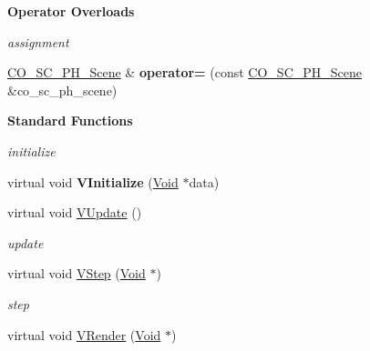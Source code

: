 \begin{Indent}{\bf Operator Overloads}\par
{\em \label{_amgrpffbf53248b2217a5cbc374d28018eed5}
 assignment }\begin{DoxyCompactItemize}
\item 
\hypertarget{classContent_1_1Scene_1_1Physics_1_1Scene_aa3fdd13535d6f89dfc48e1dc81714ae4}{
\hyperlink{classContent_1_1Scene_1_1Physics_1_1Scene}{CO\_\-SC\_\-PH\_\-Scene} \& {\bfseries operator=} (const \hyperlink{classContent_1_1Scene_1_1Physics_1_1Scene}{CO\_\-SC\_\-PH\_\-Scene} \&co\_\-sc\_\-ph\_\-scene)}
\label{classContent_1_1Scene_1_1Physics_1_1Scene_aa3fdd13535d6f89dfc48e1dc81714ae4}

\end{DoxyCompactItemize}
\end{Indent}
\begin{Indent}{\bf Standard Functions}\par
{\em \label{_amgrp73a6f6f6732ceea086632f66fc34a9e7}
 initialize }\begin{DoxyCompactItemize}
\item 
\hypertarget{classContent_1_1Scene_1_1Physics_1_1Scene_a6e48c9e5d834d7318cb09d72dee81846}{
virtual void {\bfseries VInitialize} (\hyperlink{structVoid}{Void} $\ast$data)}
\label{classContent_1_1Scene_1_1Physics_1_1Scene_a6e48c9e5d834d7318cb09d72dee81846}

\item 
\hypertarget{classContent_1_1Scene_1_1Physics_1_1Scene_a8649b5629b971e5a431e553a5f4871f7}{
virtual void \hyperlink{classContent_1_1Scene_1_1Physics_1_1Scene_a8649b5629b971e5a431e553a5f4871f7}{VUpdate} ()}
\label{classContent_1_1Scene_1_1Physics_1_1Scene_a8649b5629b971e5a431e553a5f4871f7}

\begin{DoxyCompactList}\small\item\em update \item\end{DoxyCompactList}\item 
\hypertarget{classContent_1_1Scene_1_1Physics_1_1Scene_ac8a13c9a1f2f4cc1f085bf5954b93bd2}{
virtual void \hyperlink{classContent_1_1Scene_1_1Physics_1_1Scene_ac8a13c9a1f2f4cc1f085bf5954b93bd2}{VStep} (\hyperlink{structVoid}{Void} $\ast$)}
\label{classContent_1_1Scene_1_1Physics_1_1Scene_ac8a13c9a1f2f4cc1f085bf5954b93bd2}

\begin{DoxyCompactList}\small\item\em step \item\end{DoxyCompactList}\item 
\hypertarget{classContent_1_1Scene_1_1Physics_1_1Scene_a22a3b2c22035e3fc4c6f4de81a9d524f}{
virtual void \hyperlink{classContent_1_1Scene_1_1Physics_1_1Scene_a22a3b2c22035e3fc4c6f4de81a9d524f}{VRender} (\hyperlink{structVoid}{Void} $\ast$)}
\label{classContent_1_1Scene_1_1Physics_1_1Scene_a22a3b2c22035e3fc4c6f4de81a9d524f}


\end{DoxyCompactItemize}
\end{Indent}
